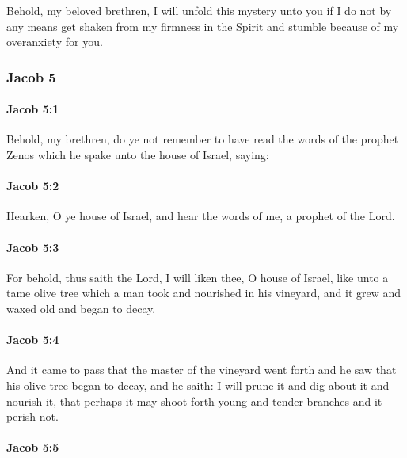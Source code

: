 			Behold, my beloved brethren, I will unfold this mystery unto you
			if I do not by any means get shaken from my firmness in the Spirit
			and stumble because of my overanxiety for you.

	\subsubsection{Jacob 5} %
		\label{JACOB-5}
		
		\paragraph{Jacob 5:1} %
			\label{JACOB-5-1}

			Behold, my brethren, do ye not remember
			to have read the words of the prophet Zenos
			which he spake unto the house of Israel, saying:

		\paragraph{Jacob 5:2} %
			\label{JACOB-5-2}

			Hearken, O ye house of Israel,
			and hear the words of me, a prophet of the Lord.

		\paragraph{Jacob 5:3} %
			\label{JACOB-5-3}

			For behold, thus saith the Lord,
			I will liken thee, O house of Israel, like unto a tame olive tree
			which a man took and nourished in his vineyard,
			and it grew and waxed old and began to decay.

		\paragraph{Jacob 5:4} %
			\label{JACOB-5-4}

			And it came to pass that the master of the vineyard went forth
			and he saw that his olive tree began to decay, and he saith:
			I will prune it and dig about it and nourish it,
			that perhaps it may shoot forth young and tender branches and it perish not.

		\paragraph{Jacob 5:5} %
			\label{JACOB-5-5}

